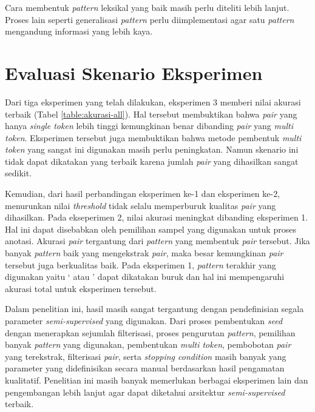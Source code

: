 Cara membentuk \textit{pattern} leksikal yang baik masih perlu diteliti lebih lanjut. Proses lain seperti generalisasi \textit{pattern} perlu diimplementasi agar satu \textit{pattern} mengandung informasi yang lebih kaya.

\section{Evaluasi Skenario Eksperimen}
Dari tiga eksperimen yang telah dilakukan, eksperimen 3 memberi nilai akurasi terbaik (Tabel \ref{table:akurasi-all}). Hal tersebut membuktikan bahwa \textit{pair} yang hanya \textit{single token} lebih tinggi kemungkinan benar dibanding \textit{pair} yang \textit{multi token}. Eksperimen tersebut juga membuktikan bahwa metode pembentuk \textit{multi token} yang sangat ini digunakan masih perlu peningkatan. Namun skenario ini tidak dapat dikatakan yang terbaik karena jumlah \textit{pair} yang dihasilkan sangat sedikit.

Kemudian, dari hasil perbandingan eksperimen ke-1 dan eksperimen ke-2, menurunkan nilai \textit{threshold} tidak selalu memperburuk kualitas \textit{pair} yang dihasilkan. Pada ekseperimen 2, nilai akurasi meningkat dibanding eksperimen 1. Hal ini dapat disebabkan oleh pemilihan sampel yang digunakan untuk proses anotasi. Akurasi \textit{pair} tergantung dari \textit{pattern} yang membentuk \textit{pair} tersebut. Jika banyak \textit{pattern} baik yang mengekstrak \textit{pair}, maka besar kemungkinan \textit{pair} tersebut juga berkualitas baik. Pada eksperimen 1, \textit{pattern} terakhir yang digunakan yaitu `{\tagHypernym} atau {\tagHyponym}' dapat dikatakan buruk dan hal ini mempengaruhi akurasi total untuk eksperimen tersebut.

Dalam penelitian ini, hasil masih sangat tergantung dengan pendefinisian segala parameter \textit{semi-supervised} yang digunakan. Dari proses pembentukan \textit{seed} dengan menerapkan sejumlah filterisasi, proses pengurutan \textit{pattern}, pemilihan banyak \textit{pattern} yang digunakan, pembentukan \textit{multi token}, pembobotan \textit{pair} yang terekstrak, filterisasi \textit{pair}, serta \textit{stopping condition} masih banyak yang parameter yang didefinisikan secara manual berdasarkan hasil pengamatan kualitatif. Penelitian ini masih banyak memerlukan berbagai eksperimen lain dan pengembangan lebih lanjut agar dapat diketahui arsitektur \textit{semi-supervised} terbaik. 
